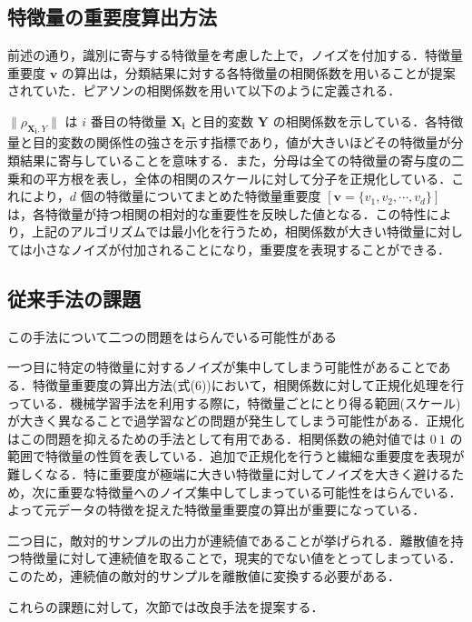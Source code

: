 \subsection{特徴量の重要度算出方法}

前述の通り，識別に寄与する特徴量を考慮した上で，ノイズを付加する．特徴量重要度 $\bm{v}$ の算出は，分類結果に対する各特徴量の相関係数を用いることが提案されていた．ピアソンの相関係数を用いて以下のように定義される．

$\|\rho_{\bm{X_i},Y}\|$ は $i$ 番目の特徴量 $\bm{X_i}$ と目的変数 $\bm{Y}$ の相関係数を示している．各特徴量と目的変数の関係性の強さを示す指標であり，値が大きいほどその特徴量が分類結果に寄与していることを意味する．また，分母は全ての特徴量の寄与度の二乗和の平方根を表し，全体の相関のスケールに対して分子を正規化している．これにより，$d$ 個の特徴量についてまとめた特徴量重要度 $[ \bm{v} = \{v_1, v_2, \cdots, v_d\} ]$ は，各特徴量が持つ相関の相対的な重要性を反映した値となる．この特性により，上記のアルゴリズムでは最小化を行うため，相関係数が大きい特徴量に対しては小さなノイズが付加されることになり，重要度を表現することができる．



\subsection{従来手法の課題}

この手法について二つの問題をはらんでいる可能性がある

一つ目に特定の特徴量に対するノイズが集中してしまう可能性があることである．特徴量重要度の算出方法(式(6))において，相関係数に対して正規化処理を行っている．機械学習手法を利用する際に，特徴量ごとにとり得る範囲(スケール)が大きく異なることで過学習などの問題が発生してしまう可能性がある．正規化はこの問題を抑えるための手法として有用である．\cite{LawOfAwesomeDataScientist}相関係数の絶対値では $0~1$ の範囲で特徴量の性質を表している．追加で正規化を行うと繊細な重要度を表現が難しくなる．特に重要度が極端に大きい特徴量に対してノイズを大きく避けるため，次に重要な特徴量へのノイズ集中してしまっている可能性をはらんでいる．よって元データの特徴を捉えた特徴量重要度の算出が重要になっている．
    

二つ目に，敵対的サンプルの出力が連続値であることが挙げられる．離散値を持つ特徴量に対して連続値を取ることで，現実的でない値をとってしまっている．このため，連続値の敵対的サンプルを離散値に変換する必要がある．

これらの課題に対して，次節では改良手法を提案する．